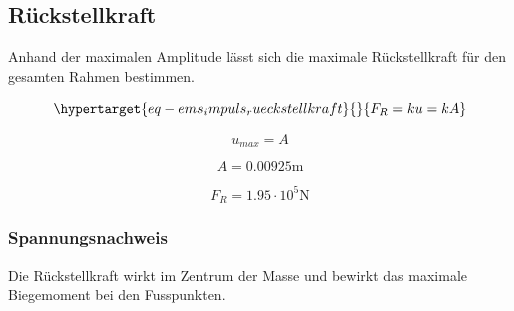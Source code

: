 \documentclass[
  letterpaper,
  DIV=11]{scrreprt}
\begin{document}
\hypertarget{ruxfcckstellkraft}{%
\subsection{Rückstellkraft}\label{ruxfcckstellkraft}}

Anhand der maximalen Amplitude lässt sich die maximale Rückstellkraft
für den gesamten Rahmen bestimmen.

\begin{equation}\protect\hypertarget{eq-ems_impuls_rueckstellkraft}{}{
F_R = k   u = k   A
}\label{eq-ems_impuls_rueckstellkraft}\end{equation}

\begin{equation}u_{max} = A\end{equation}

\begin{equation}A = 0.00925 \text{m}\end{equation}

\begin{equation}F_{R} = 1.95 \cdot 10^{5} \text{N}\end{equation}

\hypertarget{spannungsnachweis}{%
\subsubsection{Spannungsnachweis}\label{spannungsnachweis}}

Die Rückstellkraft wirkt im Zentrum der Masse und bewirkt das maximale
Biegemoment bei den Fusspunkten.
\end{document}
